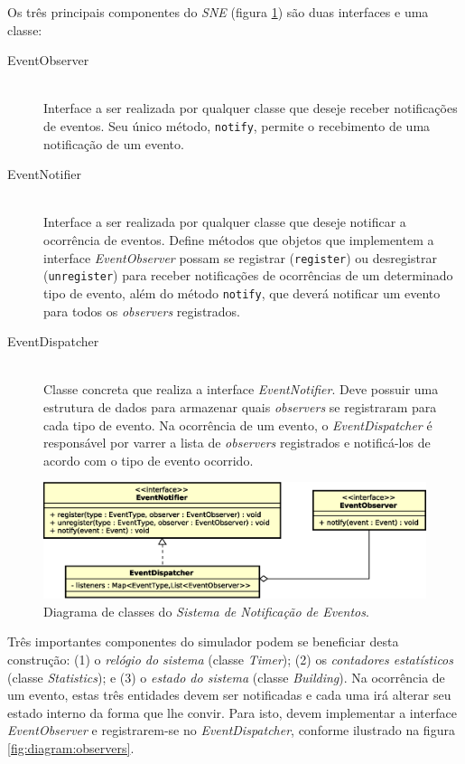 Os três principais componentes do \textit{SNE} (figura
\ref{fig:diagram:notification}) são duas interfaces e uma classe:

\begin{description}
  \item[EventObserver] \hfill \\
    Interface a ser realizada por qualquer classe que deseje receber
    notificações de eventos. Seu único método, \texttt{notify}, permite o
    recebimento de uma notificação de um evento.

  \item[EventNotifier] \hfill \\
    Interface a ser realizada por qualquer classe que deseje notificar a
    ocorrência de eventos. Define métodos que objetos que implementem a
    interface \textit{EventObserver} possam se registrar (\texttt{register}) ou
    desregistrar (\texttt{unregister}) para receber notificações de ocorrências
    de um determinado tipo de evento, além do método \texttt{notify}, que deverá
    notificar um evento para todos os \textit{observers} registrados.

\item[EventDispatcher] \hfill \\
    Classe concreta que realiza a interface \textit{EventNotifier}. Deve possuir
    uma estrutura de dados para armazenar quais \textit{observers} se
    registraram para cada tipo de evento. Na ocorrência de um evento, o
    \textit{EventDispatcher} é responsável por varrer a lista de
    \textit{observers} registrados e notificá-los de acordo com o tipo de evento
    ocorrido.

\end{description}

\begin{figure}[htb!]
  \centering
  \includegraphics[scale=0.6]{img/Notification.eps}
  \caption{Diagrama de classes do \textit{Sistema de Notificação de Eventos}.}
\label{fig:diagram:notification}
\end{figure}

Três importantes componentes do simulador podem se beneficiar desta construção:
(1) o \textit{relógio do sistema} (classe \textit{Timer}); (2) os
\textit{contadores estatísticos} (classe \textit{Statistics}); e (3) o
\textit{estado do sistema} (classe \textit{Building}). Na ocorrência de um
evento, estas três entidades devem ser notificadas e cada uma irá alterar seu
estado interno da forma que lhe convir. Para isto, devem implementar a interface
\textit{EventObserver} e registrarem-se no \textit{EventDispatcher}, conforme
ilustrado na figura \ref{fig:diagram:observers}.


